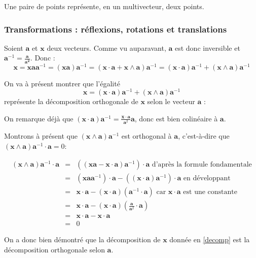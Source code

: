 \newpage
Une paire de points représente, en un multivecteur, deux points. 

\subsubsection{Transformations : réflexions, rotations et translations}
\label{transformations}
 Soient $\bm{a}$ et $\bm{x}$ deux vecteurs. Comme vu auparavant, $\bm{a}$ est donc inversible et $\bm{a}^{-1} = \frac{\bm{a}}{\bm{a^2}}$. Donc : 
\begin{equation*}
\bm{x} = \bm{x a a}^{-1} = (\bm{xa})\bm{a}^{-1}= (\bm{x}\cdot \bm{a} + \bm{x} \wedge \bm{a})\bm{a}^{-1} = (\bm{x}\cdot \bm{a})\bm{a}^{-1} + (\bm{x} \wedge \bm{a})\bm{a}^{-1}
\end{equation*}

On va à présent montrer que l'égalité 
\begin{equation}
\bm{x} =  (\bm{x}\cdot \bm{a})\bm{a}^{-1} + (\bm{x} \wedge \bm{a})\bm{a}^{-1}\label{decomp}
\end{equation}
représente la décomposition orthogonale de $\bm{x}$ selon le vecteur $\bm{a}$ : 

On remarque déjà que $(\bm{x}\cdot \bm{a})\bm{a}^{-1} = \frac{\bm{x}\cdot \bm{a}}{\bm{a}^2}\bm{a}$, donc est bien colinéaire à $\bm{a}$.

Montrons à présent que $(\bm{x}\wedge \bm{a})\bm{a}^{-1}$ est orthogonal à $\bm{a}$, c'est-à-dire que $(\bm{x}\wedge \bm{a})\bm{a}^{-1} \cdot \bm{a} = 0 $: 

\begin{eqnarray*}
(\bm{x}\wedge \bm{a})\bm{a}^{-1} \cdot \bm{a} &=&  ((\bm{x}\bm{a}-\bm{x}\cdot \bm{a} )\bm{a}^{-1}) \cdot \bm{a}  \text{ d'après la formule fondamentale}\\
&=&  (\bm{x}\bm{a}\bm{a}^{-1}) \cdot \bm{a}-((\bm{x}\cdot \bm{a})\bm{a}^{-1}) \cdot \bm{a} \text{ en développant}\\
&=&  \bm{x} \cdot \bm{a}-(\bm{x}\cdot \bm{a})(\bm{a}^{-1} \cdot \bm{a}) \text{ car } \bm{x}\cdot \bm{a} \text{ est une constante }\\
&=&  \bm{x} \cdot \bm{a}-(\bm{x}\cdot \bm{a})(\frac{\bm{a}}{\bm{a}^2}\cdot \bm{a}) \\
&=&  \bm{x} \cdot \bm{a}-\bm{x}\cdot \bm{a}\\
&=&  0
\end{eqnarray*}

On a donc bien démontré que la décomposition de $\bm{x}$ donnée en \ref{decomp} est la décomposition orthogonale selon $\bm{a}$.

